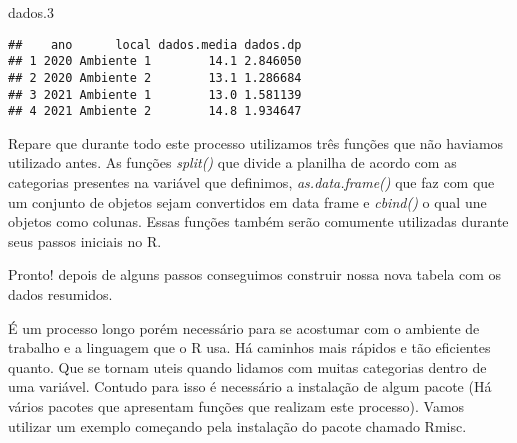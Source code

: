 \documentclass[]{book}
\newenvironment{Shaded}{\begin{snugshade}}{\end{snugshade}}
\newcommand{\FloatTok}[1]{\textcolor[rgb]{0.00,0.00,0.81}{#1}}
\newcommand{\KeywordTok}[1]{\textcolor[rgb]{0.13,0.29,0.53}{\textbf{#1}}}
\newcommand{\NormalTok}[1]{#1}
\newcommand{\OperatorTok}[1]{\textcolor[rgb]{0.81,0.36,0.00}{\textbf{#1}}}
\newcommand{\StringTok}[1]{\textcolor[rgb]{0.31,0.60,0.02}{#1}}
\begin{document}
\begin{Shaded}
\end{Shaded}

\begin{Shaded}
\begin{Highlighting}[]
\NormalTok{dados}\FloatTok{.3}
\end{Highlighting}
\end{Shaded}

\begin{verbatim}
##    ano      local dados.media dados.dp
## 1 2020 Ambiente 1        14.1 2.846050
## 2 2020 Ambiente 2        13.1 1.286684
## 3 2021 Ambiente 1        13.0 1.581139
## 4 2021 Ambiente 2        14.8 1.934647
\end{verbatim}

Repare que durante todo este processo utilizamos três funções que não haviamos utilizado antes. As funções \emph{split()} que divide a planilha de acordo com as categorias presentes na variável que definimos, \emph{as.data.frame()} que faz com que um conjunto de objetos sejam convertidos em data frame e \emph{cbind()} o qual une objetos como colunas. Essas funções também serão comumente utilizadas durante seus passos iniciais no R.

Pronto! depois de alguns passos conseguimos construir nossa nova tabela com os dados resumidos.

É um processo longo porém necessário para se acostumar com o ambiente de trabalho e a linguagem que o R usa. Há caminhos mais rápidos e tão eficientes quanto. Que se tornam uteis quando lidamos com muitas categorias dentro de uma variável. Contudo para isso é necessário a instalação de algum pacote (Há vários pacotes que apresentam funções que realizam este processo). Vamos utilizar um exemplo começando pela instalação do pacote chamado Rmisc.
\end{document}
